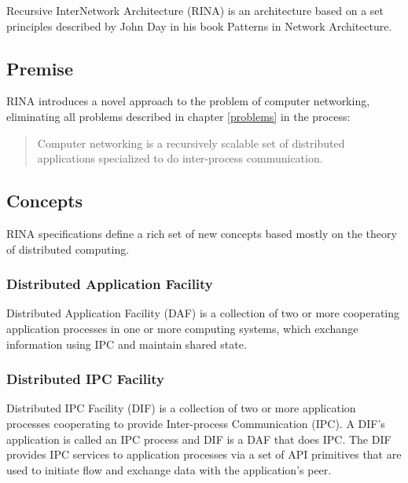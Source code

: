        Recursive InterNetwork Architecture (RINA) is an architecture based on a set principles described by John Day in his book Patterns in Network Architecture. \cite{Patterns}

        \subsection{Premise}

            RINA introduces a novel approach to the problem of computer networking, eliminating all problems described in chapter \ref{problems} in the process:

            \begin{quotation}
                \centering
                Computer networking is a recursively scalable set of distributed applications specialized to do inter-process communication.
            \end{quotation}

        \subsection{Concepts}

            RINA specifications define a rich set of new concepts based mostly on the theory of distributed computing.

            \subsubsection{Distributed Application Facility}

                Distributed Application Facility (DAF) is a collection of two or more cooperating application processes in one or more computing systems, which exchange information using IPC and maintain shared state.

            \subsubsection{Distributed IPC Facility}

                Distributed IPC Facility (DIF) is a collection of two or more application processes cooperating to provide Inter-process Communication (IPC). A DIF's application is called an IPC process and DIF is a DAF that does IPC. The DIF provides IPC services to application processes via a set of API primitives that are used to initiate flow and exchange data with the application's peer.


